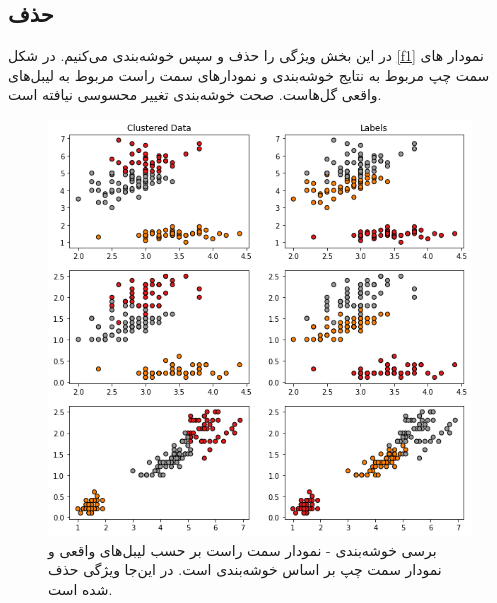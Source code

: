 \documentclass[a4paper]{article}
\begin{document}
\begin{large}
\subsection{حذف 
}
در این بخش ویژگی 
	را حذف و سپس خوشه‌بندی می‌کنیم.
	در شکل
	\eqref{f1}
	نمودار های سمت چپ مربوط به نتایج خوشه‌بندی و نمودار‌های سمت  راست مربوط به لیبل‌های واقعی گل‌هاست. صحت خوشه‌بندی تغییر محسوسی نیافته است.

\begin{figure}[h!]
	\centering
	\includegraphics[scale=0.6]{f1.png}
	\caption{برسی خوشه‌بندی - نمودار سمت راست بر حسب لیبل‌های واقعی و نمودار سمت چپ بر اساس خوشه‌بندی 
		است. در این‌جا ویژگی  
			حذف شده است.
	}
	\label{f1}
\end{figure}

\newpage

\end{large}
\end{document}
